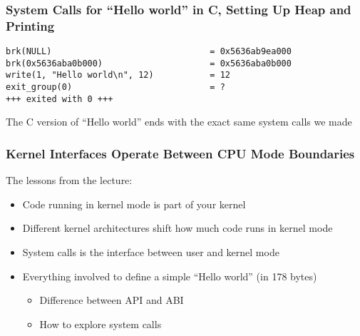   \begin{frame}[fragile]
    \frametitle{System Calls for ``Hello world'' in C, Setting Up Heap and
                Printing}

    \begin{lstlisting}
brk(NULL)                               = 0x5636ab9ea000
brk(0x5636aba0b000)                     = 0x5636aba0b000
write(1, "Hello world\n", 12)           = 12
exit_group(0)                           = ?
+++ exited with 0 +++
    \end{lstlisting}

    \vspace{1em}
    The C version of ``Hello world'' ends with the exact same system calls we
    made
  \end{frame}


  \begin{frame}
    \frametitle{Kernel Interfaces Operate Between CPU Mode Boundaries}

    The lessons from the lecture:
    \begin{itemize}
      \item Code running in kernel mode is part of your kernel
      \item Different kernel architectures shift how much code runs in kernel mode
      \item System calls is the interface between user and kernel mode
      \item Everything involved to define a simple ``Hello world'' (in 178 bytes)
      \begin{itemize}
        \item Difference between API and ABI
        \item How to explore system calls
      \end{itemize}
    \end{itemize}
  \end{frame}


